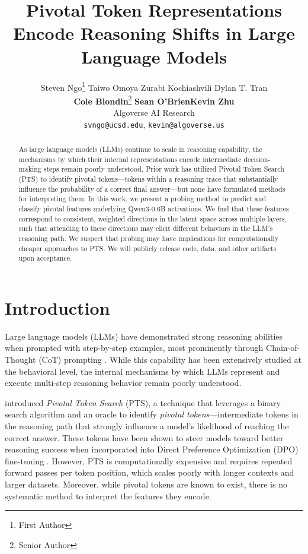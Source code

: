 \documentclass{article}
\title{Pivotal Token Representations Encode Reasoning Shifts in Large Language Models}
\author{%
Steven Ngo\thanks{First Author} \quad Taiwo Omoya \quad Zurabi
Kochiashvili \quad Dylan T. Tran \quad \\
\textbf{Cole Blondin}\thanks{Senior Author} \quad \textbf{Sean
O'Brien}\footnotemark[2] \quad \textbf{Kevin
Zhu} \footnotemark[2] \\
Algoverse AI Research \\
\texttt{svngo@ucsd.edu},  
\texttt{kevin@algoverse.us}
}
\begin{document}
\maketitle


\begin{abstract}
As large language models (LLMs) continue to scale in reasoning capability, the mechanisms by which their internal representations encode intermediate decision-making steps remain poorly understood. Prior work has utilized Pivotal Token Search (PTS) to identify pivotal tokens—tokens within a reasoning trace that substantially influence the probability of a correct final answer—but none have formulated methods for interpreting them. In this work, we present a probing method to predict and classify pivotal features underlying Qwen3-0.6B activations. We find that these features correspond to consistent, weighted directions in the latent space across multiple layers, such that attending to these directions may elicit different behaviors in the LLM's reasoning path. We suspect that probing may have implications for computationally cheaper approaches to PTS. We will publicly release code, data, and other artifacts upon acceptance.
\end{abstract}


\section{Introduction}


Large language models (LLMs) have demonstrated strong reasoning abilities when prompted with step-by-step examples, most prominently through Chain-of-Thought (CoT) prompting \citep{wei2023chainofthoughtpromptingelicitsreasoning}. While this capability has been extensively studied at the behavioral level, the internal mechanisms by which LLMs represent and execute multi-step reasoning behavior remain poorly understood. 

\citet{abdin2024phi4technicalreport} introduced \textit{Pivotal Token Search} (PTS), a technique that leverages a binary search algorithm and an oracle to identify \textit{pivotal tokens}—intermediate tokens in the reasoning path that strongly influence a model’s likelihood of reaching the correct answer. These tokens have been shown to steer models toward better reasoning success when incorporated into Direct Preference Optimization (DPO) fine-tuning \citep{lin2025criticaltokensmattertokenlevel,abdin2024phi4technicalreport}. However, PTS is computationally expensive and requires repeated forward passes per token position, which scales poorly with longer contexts and larger datasets. Moreover, while pivotal tokens are known to exist, there is no systematic method to interpret the features they encode. 
\end{document}
